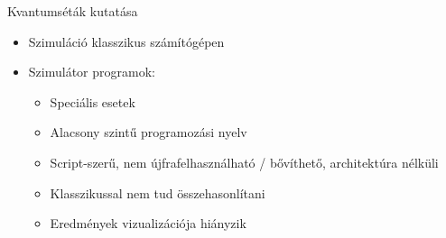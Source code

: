 \documentclass[aspectratio=169]{beamer}
\begin{document}
\begin{frame}{Kvantumséták kutatása}
    \begin{itemize}
        \item Szimuláció klasszikus számítógépen
        \item Szimulátor programok:
            \begin{itemize}
                \item Speciális esetek
                \item Alacsony szintű programozási nyelv
                \item Script-szerű, nem újfrafelhasználható / bővíthető, architektúra nélküli
                \item Klasszikussal nem tud összehasonlítani
                \item Eredmények vizualizációja hiányzik
            \end{itemize}
    \end{itemize}
\end{frame}
\end{document}
